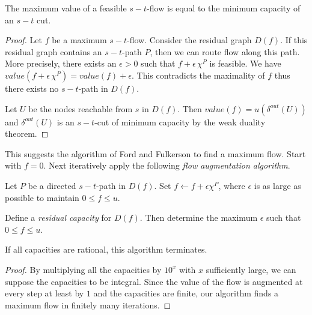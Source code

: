 \begin{theorem}
  \label{f:thr:8}
  The maximum value of a feasible $s-t$-flow is equal to the minimum
  capacity of an $s-t$ cut.
\end{theorem}

\begin{proof}
  Let $f$ be a maximum $s-t$-flow. Consider the residual graph
  $D(f)$. If this residual graph contains an 
  $s-t$-path $P$, then we can route flow along this path. More
  precisely, there exists an $\epsilon>0$ such that $f + \epsilon \, \chi^P$ is feasible.
  We have $value(f + \epsilon \, \chi^P) = value(f) + \epsilon $. This contradicts the
  maximality of $f$ thus there exists no $s-t$-path in $D(f)$. 
  
  Let $U$ be the nodes reachable from $s$ in $D(f)$. Then 
  $value(f)=u(\delta^{out}(U))$ and $\delta^{out}(U)$ is an
  $s-t$-cut of minimum capacity by the weak duality theorem.
\end{proof}
 


This suggests the algorithm of Ford and Fulkerson to find a maximum
flow. Start with $f = 0$. Next iteratively apply the following
\emph{flow augmentation algorithm}. 


Let $P$ be a directed $s-t$-path in $D(f)$. Set $f \gets f + \epsilon\chi^P$, where
$\epsilon$ is as large as possible to maintain $0\leq f\leq u$. 

\begin{exercise}
   Define a \emph{residual capacity} for $D(f)$. Then determine 
   the maximum $\epsilon$ such that $0\leq f\leq u$.
\end{exercise}

\begin{theorem}
  \label{f:thr:9}
  If all capacities are rational, this algorithm terminates. 
\end{theorem}

\begin{proof}
   By multiplying all the capacities by $10^x$ with $x$ 
   sufficiently large, we can suppose the capacities to be 
   integral. Since the value of the flow is augmented at 
   every step at least by $1$ and the capacities are finite, our 
   algorithm finds a maximum flow in finitely many iterations.
\end{proof}


